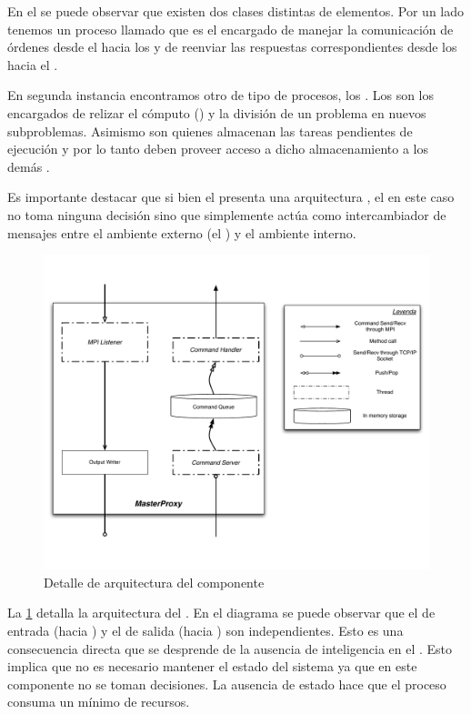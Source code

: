 En el \bend se puede observar que existen dos clases distintas de elementos.
Por un lado tenemos un proceso llamado \master que es el encargado de manejar
la comunicación de órdenes desde el \fend hacia los \ws y de reenviar las
respuestas correspondientes desde los \ws hacia el \fend.

En segunda instancia encontramos otro de tipo de procesos, los \ws. Los \ws
son los encargados de relizar el cómputo (\ssolving) y la división de un
problema en nuevos subproblemas. Asimismo son quienes almacenan las tareas
pendientes de ejecución y por lo tanto deben proveer acceso a dicho
almacenamiento a los demás \ws.

Es importante destacar que si bien el \bend presenta una arquitectura
\masterslave, el \master en este caso no toma ninguna decisión sino que
simplemente actúa como intercambiador de mensajes entre el ambiente externo
(el \fend) y el ambiente interno.

\begin{figure}[h!]
\centering
\includegraphics[scale=0.4]{graphs/master proxy detail}
\caption{Detalle de arquitectura del componente \master}
\label{fig:masterproxydetail}
\end{figure}

La \fig\ref{fig:masterproxydetail} detalla la arquitectura del \master. En el
diagrama se puede observar que el \datapath de entrada (\fend hacia \bend) y
el de salida (\bend hacia \fend) son independientes. Esto es una consecuencia
directa que se desprende de la ausencia de inteligencia en el \master. Esto
implica que no es necesario mantener el estado del sistema ya que en este
componente no se toman decisiones. La ausencia de estado hace que el proceso
\master consuma un mínimo de recursos.

